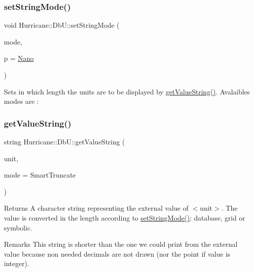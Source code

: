 \subsubsection{\texorpdfstring{set\+String\+Mode()}{setStringMode()}}
{\footnotesize\ttfamily void Hurricane\+::\+Db\+U\+::set\+String\+Mode (\begin{DoxyParamCaption}\item[{unsigned int}]{mode,  }\item[{\mbox{\hyperlink{group__DbUGroup_ga50b5785bf4d75026c4c112caec3040a7}{Unit\+Power}}}]{p = {\ttfamily \mbox{\hyperlink{group__DbUGroup_gga50b5785bf4d75026c4c112caec3040a7a03e5923be5810db830626f2ca26319d6}{Nano}}} }\end{DoxyParamCaption})\hspace{0.3cm}{\ttfamily [static]}}

Sets in which length the units are to be displayed by \mbox{\hyperlink{group__DbUGroup_gadc9c1a06b4296dbddcf711077113f4bd}{get\+Value\+String()}}. Avalaibles modes are \+: \mbox{\label{group__DbUGroup_gadc9c1a06b4296dbddcf711077113f4bd}} 
\subsubsection{\texorpdfstring{get\+Value\+String()}{getValueString()}}
{\footnotesize\ttfamily string Hurricane\+::\+Db\+U\+::get\+Value\+String (\begin{DoxyParamCaption}\item[{\mbox{\hyperlink{group__DbUGroup_ga4fbfa3e8c89347af76c9628ea06c4146}{Unit}}}]{unit,  }\item[{int}]{mode = {\ttfamily SmartTruncate} }\end{DoxyParamCaption})\hspace{0.3cm}{\ttfamily [static]}}

\begin{DoxyReturn}{Returns}
A character string representing the external value of {\ttfamily $<$unit$>$}. The value is converted in the length according to \mbox{\hyperlink{group__DbUGroup_ga89ab8f8326c54113336086663ecf1d25}{set\+String\+Mode()}}\+: database, grid or symbolic.
\end{DoxyReturn}
\begin{DoxyRemark}{Remarks}
This string is shorter than the one we could print from the external value because non needed decimals are not drawn (nor the point if value is integer). 
\end{DoxyRemark}
\mbox{\label{group__DbUGroup_gace9a8644e7e80dcaed2a8a95deeb1622}} 
